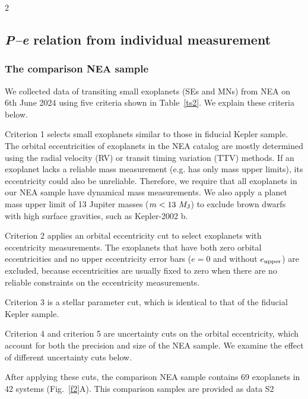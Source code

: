 \documentclass[10pt]{article}
\begin{document}
\begin{multicols}{2}
\subsection*{\hypertarget{s2}{\emph{P--e} relation from individual measurement}}
\subsubsection*{\hypertarget{s2.1}{The comparison NEA sample}}
\noindent We collected data of transiting small exoplanets (SEs and MNs) from NEA\cite{2013PASP..125..989A,NEA2024} on 6th June 2024 using five criteria shown in Table~\ref{ts2}.
We explain these criteria below.

Criterion 1 selects small exoplanets similar to those in fiducial Kepler sample.
The orbital eccentricities of exoplanets in the NEA catalog are mostly determined using the radial velocity (RV) or transit timing variation (TTV) methods.
If an exoplanet lacks a reliable mass measurement (e.g. has only mass upper limits), its eccentricity could also be unreliable.
Therefore, we require that all exoplanets in our NEA sample have dynamical mass measurements.
We also apply a planet mass upper limit of 13 Jupiter masses ($m<13~M_{\rm J}$) to exclude brown dwarfs with high surface gravities, such as Kepler-2002 b.

Criterion 2 applies an orbital eccentricity cut to select exoplanets with eccentricity measurements.
The exoplanets that have both zero orbital eccentricities and no upper eccentricity error bars ($e=0$ and without $e_{\rm upper}$) are excluded, because eccentricities are usually fixed to zero when there are no reliable constraints on the eccentricity measurements.

Criterion 3 is a stellar parameter cut, which is identical to that of the fiducial Kepler sample.

Criterion 4 and criterion 5 are uncertainty cuts on the orbital eccentricity, which account for both the precision and size of the NEA sample.
We examine the effect of different uncertainty cuts below.

After applying these cuts, the comparison NEA sample contains 69 exoplanets in 42 systems (Fig.~\ref{f2}A).
This comparison samples are provided as data S2\cite{zenodo}
\end{multicols}
\end{document}
